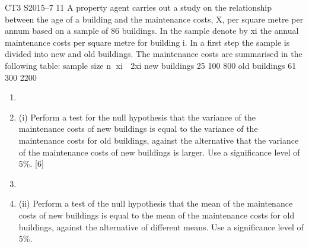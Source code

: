 \documentclass[a4paper,12pt]{article}
\begin{document}
\begin{enumerate}

CT3 S2015–7
11 A property agent carries out a study on the relationship between the age of a building and the maintenance costs, X, per square metre per annum based on a sample of 86 buildings. In the sample denote by xi the annual maintenance costs per square metre
for building i. In a first step the sample is divided into new and old buildings. The
maintenance costs are summarised in the following table:
  sample size n xi  2xi
new buildings 25 100 800
old buildings 61 300 2200
\begin{enumerate}[\item (i)]
\item \item (i) Perform a test for the null hypothesis that the variance of the maintenance costs of new buildings is equal to the variance of the maintenance costs for old buildings, against the alternative that the variance of the maintenance costs of new buildings is larger. Use a significance level of 5\%. [6]

\item \item (ii) Perform a test of the null hypothesis that the mean of the maintenance costs of new buildings is equal to the mean of the maintenance costs for old buildings, against the alternative of different means. Use a significance level of 5\%. 
\end{enumerate}


\end{enumerate}
\end{document}
